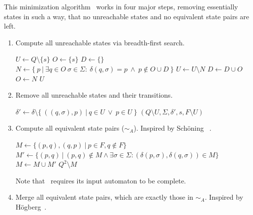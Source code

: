 This minimization algorithm \MinAlg\ works in four major steps, removing essentially states in such a way, that no unreachable states and no equivalent state pairs are left.
\begin{enumerate}
	\item Compute all unreachable states via breadth-first search.
	
	\vspace{0.2cm}
	\begin{algorithmic}[1]
			\State $U \gets Q \setminus \{s\}$	
			\State $O \gets \{s\}$				
			\State $D \gets \{\}$				
				\State $N \gets \{\ p\ | \ \exists q \in O\ \sigma \in \Sigma \colon\ \delta(q, \sigma) = p\ \land\ p \notin O \cup D\ \}$
				\State $U \gets U \setminus N$
				\State $D \gets D \cup O$
				\State $O \gets N$
			\EndWhile
			\State \Return $U$
		\EndFunction
	\end{algorithmic}

	\item Remove all unreachable states and their transitions.
	
	\vspace{0.2cm}
	\begin{algorithmic}[1]
            \State $\delta' \gets \delta \setminus \{\ ((q,\sigma),p)\ |\ q\in U\ \lor\ p\in U\ \}$
			\State \Return $(Q \setminus U, \Sigma, \delta', s, F \setminus U)$
		\EndFunction
	\end{algorithmic}

	\item Compute all equivalent state pairs ($\sim_A$). Inspired by Schöning~\cite[p. 46]{Sch01} .
	
	\vspace{0.2cm}
	\begin{algorithmic}[1]
		 \label{ch:1:minmark}
		\State $M \gets \{ (p,q), (q,p)\ |\ p \in F, q \notin F \}$
		\Do
			\State $M' \gets \{ (p,q)\ |\ (p,q) \notin M \land \exists \sigma \in \Sigma \colon (\delta(p,\sigma), \delta(q,\sigma)) \in M \}$
			\State $M \gets M \cup M'$
		\State \Return $Q^2 \setminus M$
		\EndFunction
	\end{algorithmic}
	Note that \CompDist\ requires its input automaton to be complete. 

	\item Merge all equivalent state pairs, which are exactly those in $\sim_A$. Inspired by Högberg~\cite[p. 10]{HL20}.
	

\end{enumerate}
